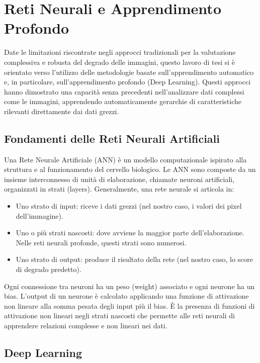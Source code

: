 \section{Reti Neurali e Apprendimento Profondo}

Date le limitazioni riscontrate negli approcci tradizionali per la valutazione complessiva e robusta del degrado delle immagini, questo lavoro di tesi si è orientato verso l'utilizzo delle metodologie basate sull'apprendimento automatico e, in particolare, sull'apprendimento profondo (Deep Learning). Questi approcci hanno dimostrato una capacità senza precedenti nell'analizzare dati complessi come le immagini, apprendendo automaticamente gerarchie di caratteristiche rilevanti direttamente dai dati grezzi.

\subsection{Fondamenti delle Reti Neurali Artificiali}

Una Rete Neurale Artificiale (ANN) è un modello computazionale ispirato alla struttura e al funzionamento del cervello biologico. Le ANN sono composte da un insieme interconnesso di unità di elaborazione, chiamate neuroni artificiali, organizzati in strati (layers). Generalmente, una rete neurale si articola in:
\begin{itemize}
    \item Uno strato di input: riceve i dati grezzi (nel nostro caso, i valori dei pixel dell'immagine).
    \item Uno o più strati nascosti: dove avviene la maggior parte dell'elaborazione. Nelle reti neurali profonde, questi strati sono numerosi.
    \item Uno strato di output: produce il risultato della rete (nel nostro caso, lo score di degrado predetto).
\end{itemize}

Ogni connessione tra neuroni ha un peso (weight) associato e ogni neurone ha un bias. L'output di un neurone è calcolato applicando una funzione di attivazione non lineare alla somma pesata degli input più il bias. È la presenza di funzioni di attivazione non lineari negli strati nascosti che permette alle reti neurali di apprendere relazioni complesse e non lineari nei dati.

\subsection{Deep Learning}

